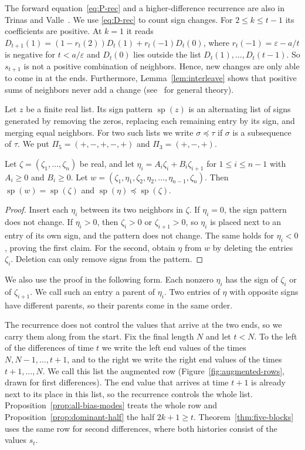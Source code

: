 The forward equation~\eqref{eq:P-rec} and a higher-difference
recurrence are also in Trinas and Valle~\cite[(2.2) and (4.10)]{tv2026}.
We use \eqref{eq:D-rec} to count sign changes. For $2\le k\le t-1$ its
coefficients are positive. At $k=1$ it reads
$D_{t+1}(1)=(1-r_t(2))D_t(1)+r_t(-1)D_t(0)$, where
$r_t(-1)=\varepsilon-a/t$ is negative for $t<a/\varepsilon$ and
$D_t(0)$ lies outside the list $D_t(1),\dots,D_t(t-1)$. So $s_{t+1}$ is
not a positive combination of neighbors. Hence, new changes are only
able to come in at the ends. Furthermore, Lemma~\ref{lem:interleave} shows that
positive sums of neighbors never add a change
(see~\cite{karlin1968,karlin1964} for general theory).

Let $z$ be a finite real list. Its sign pattern
$\operatorname{sp}(z)$ is an alternating list of signs generated by
removing the zeros, replacing each remaining entry by its sign, and
merging equal neighbors. For
two such lists we write $\sigma\preceq\tau$ if $\sigma$ is a subsequence of $\tau$. We put
$\Pi_5=(+,-,+,-,+)$ and $\Pi_3=(+,-,+)$.

\begin{lemma}\label{lem:interleave}
Let $\zeta=(\zeta_1,\dots,\zeta_n)$ be real, and let
$\eta_i=A_i\zeta_i+B_i\zeta_{i+1}$ for $1\le i\le n-1$ with $A_i\ge0$ and
$B_i\ge0$. Let $w=(\zeta_1,\eta_1,\zeta_2,\eta_2,\dots,\eta_{n-1},\zeta_n)$.
Then $\operatorname{sp}(w)=\operatorname{sp}(\zeta)$ and
$\operatorname{sp}(\eta)\preceq\operatorname{sp}(\zeta)$.
\end{lemma}

\begin{proof}
Insert each $\eta_i$ between its two neighbors in $\zeta$. If $\eta_i=0$, the
sign pattern does not change. If $\eta_i>0$, then $\zeta_i>0$ or
$\zeta_{i+1}>0$, so $\eta_i$ is placed next to an entry of its own sign, and
the pattern does not change. The same holds for $\eta_i<0$, proving the first claim.
For the second, obtain $\eta$ from $w$ by deleting the entries
$\zeta_i$. Deletion can only remove signs from the pattern.
\end{proof}

We also use the proof in the following form. Each nonzero $\eta_i$
has the sign of $\zeta_i$ or of $\zeta_{i+1}$. We call such an entry
a parent of $\eta_i$. Two entries of $\eta$ with opposite signs have
different parents, so their parents come in the same order.

The recurrence does not control the values that arrive at the two
ends, so we carry them along from the start. Fix the final length $N$
and let $t<N$. To the left of the differences of time $t$ we write the
left end values of the times $N,N-1,\dots,t+1$, and to the right we
write the right end values of the times $t+1,\dots,N$. We call this
list the augmented row (Figure~\ref{fig:augmented-rows}, drawn for
first differences). The end value that arrives at time $t+1$ is
already next to its place in this list, so the recurrence controls
the whole list. Proposition~\ref{prop:all-bias-modes} treats the
whole row and Proposition~\ref{prop:dominant-half} the half
$2k+1\ge t$. Theorem~\ref{thm:five-blocks} uses the same row for
second differences, where both histories consist of the values $s_t$.

